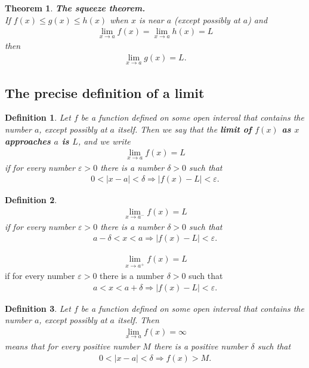 \documentclass{article}
\theoremstyle{sltheorem}
\newtheorem{definition}{Definition}[section]
\newtheorem{theorem}{Theorem}[section]
\begin{document}
\begin{theorem}
    \textbf{The squeeze theorem.}\\
    If $f(x)\leq g(x)\leq h(x)$ when $x$ is near $a$ (except possibly at $a$) and
    \begin{align*}
        \lim_{x\to a}f(x) = \lim_{x\to a}h(x) = L
    \end{align*}
    then
    \begin{align*}
        \lim_{x \to a}g(x) = L.
    \end{align*}
\end{theorem}
\subsection{The precise definition of a limit}
\begin{definition}
    Let $f$ be a function defined on some open interval that contains the number $a$, except possibly at $a$ itself. Then we say that the \textbf{limit of $f(x)$ as $x$ approaches $a$ is $L$}, and we write
    \begin{align*}
        \lim_{x\to a}f(x) = L
    \end{align*}
    if for every number $\varepsilon>0$ there is a number $\delta>0$ such that
    \begin{align*}
        0<|x-a|<\delta \Rightarrow |f(x)-L|<\varepsilon.
    \end{align*}
\end{definition}
\begin{definition}
    \begin{align*}
        \lim_{x\to a^-}f(x) = L
    \end{align*}
    if for every number $\varepsilon > 0$ there is a number $\delta > 0$ such that
    \begin{align*}
        a-\delta < x < a \Rightarrow |f(x)-L| < \varepsilon.
    \end{align*}
\end{definition}
\begin{align*}
    \lim_{x\to a^+}f(x) = L
\end{align*}
    if for every number $\varepsilon > 0$ there is a number $\delta > 0$ such that
\begin{align*}
    a < x < a+\delta \Rightarrow |f(x)-L| < \varepsilon.
\end{align*}
\begin{definition}
    Let $f$ be a function defined on some open interval that contains the number $a$, except possibly at $a$ itself. Then
    \begin{align*}
        \lim_{x\to a}f(x) = \infty
    \end{align*}
    means that for every positive number $M$ there is a positive number $\delta$ such that
    \begin{align*}
        0<|x-a|<\delta \Rightarrow f(x)>M.
    \end{align*}
\end{definition}
\end{document}
